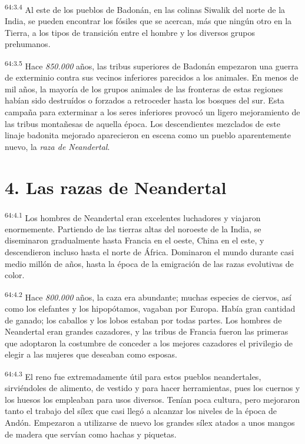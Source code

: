 \par
\textsuperscript{64:3.4} Al este de los pueblos de Badonán, en las colinas Siwalik del norte de la India, se pueden encontrar los fósiles que se acercan, más que ningún otro en la Tierra, a los tipos de transición entre el hombre y los diversos grupos prehumanos.

\par
\textsuperscript{64:3.5} Hace \textit{850.000} años, las tribus superiores de Badonán empezaron una guerra de exterminio contra sus vecinos inferiores parecidos a los animales. En menos de mil años, la mayoría de los grupos animales de las fronteras de estas regiones habían sido destruídos o forzados a retroceder hasta los bosques del sur. Esta campaña para exterminar a los seres inferiores provocó un ligero mejoramiento de las tribus montañesas de aquella época. Los descendientes mezclados de este linaje badonita mejorado aparecieron en escena como un pueblo aparentemente nuevo, la \textit{raza de Neandertal}.

\section*{4. Las razas de Neandertal}
\par
\textsuperscript{64:4.1} Los hombres de Neandertal eran excelentes luchadores y viajaron enormemente. Partiendo de las tierras altas del noroeste de la India, se diseminaron gradualmente hasta Francia en el oeste, China en el este, y descendieron incluso hasta el norte de África. Dominaron el mundo durante casi medio millón de años, hasta la época de la emigración de las razas evolutivas de color.

\par
\textsuperscript{64:4.2} Hace \textit{800.000} años, la caza era abundante; muchas especies de ciervos, así como los elefantes y los hipopótamos, vagaban por Europa. Había gran cantidad de ganado; los caballos y los lobos estaban por todas partes. Los hombres de Neandertal eran grandes cazadores, y las tribus de Francia fueron las primeras que adoptaron la costumbre de conceder a los mejores cazadores el privilegio de elegir a las mujeres que deseaban como esposas.

\par
\textsuperscript{64:4.3} El reno fue extremadamente útil para estos pueblos neandertales, sirviéndoles de alimento, de vestido y para hacer herramientas, pues los cuernos y los huesos los empleaban para usos diversos. Tenían poca cultura, pero mejoraron tanto el trabajo del sílex que casi llegó a alcanzar los niveles de la época de Andón. Empezaron a utilizarse de nuevo los grandes sílex atados a unos mangos de madera que servían como hachas y piquetas.

